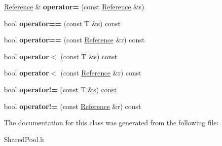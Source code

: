 \begin{DoxyCompactItemize}
\item 
\hyperlink{classSharedPool_1_1Reference}{Reference} \& {\bfseries operator=} (const \hyperlink{classSharedPool_1_1Reference}{Reference} \&s)\hypertarget{classSharedPool_1_1Reference_aa3b0558ef2b7de6056855d992bf65486}{}\label{classSharedPool_1_1Reference_aa3b0558ef2b7de6056855d992bf65486}

\item 
bool {\bfseries operator==} (const T \&s) const \hypertarget{classSharedPool_1_1Reference_ac40016cf9c2102bcf3ccacee2adb3884}{}\label{classSharedPool_1_1Reference_ac40016cf9c2102bcf3ccacee2adb3884}

\item 
bool {\bfseries operator==} (const \hyperlink{classSharedPool_1_1Reference}{Reference} \&r) const \hypertarget{classSharedPool_1_1Reference_ad1c159aa8cb12599e5a1607502dbcebe}{}\label{classSharedPool_1_1Reference_ad1c159aa8cb12599e5a1607502dbcebe}

\item 
bool {\bfseries operator$<$} (const T \&s) const \hypertarget{classSharedPool_1_1Reference_a69e4659776cf52dfd5bb9a8a6d8f4e9f}{}\label{classSharedPool_1_1Reference_a69e4659776cf52dfd5bb9a8a6d8f4e9f}

\item 
bool {\bfseries operator$<$} (const \hyperlink{classSharedPool_1_1Reference}{Reference} \&r) const \hypertarget{classSharedPool_1_1Reference_a9d48b8039bc3e04dfdf5ce4a008e2d6c}{}\label{classSharedPool_1_1Reference_a9d48b8039bc3e04dfdf5ce4a008e2d6c}

\item 
bool {\bfseries operator!=} (const T \&s) const \hypertarget{classSharedPool_1_1Reference_aa90418e9543150d6139c138de50f14be}{}\label{classSharedPool_1_1Reference_aa90418e9543150d6139c138de50f14be}

\item 
bool {\bfseries operator!=} (const \hyperlink{classSharedPool_1_1Reference}{Reference} \&r) const \hypertarget{classSharedPool_1_1Reference_a4b27cc0192bd1038b59ceef7b076b2dc}{}\label{classSharedPool_1_1Reference_a4b27cc0192bd1038b59ceef7b076b2dc}

\end{DoxyCompactItemize}


The documentation for this class was generated from the following file\+:\begin{DoxyCompactItemize}
\item 
Shared\+Pool.\+h\end{DoxyCompactItemize}
